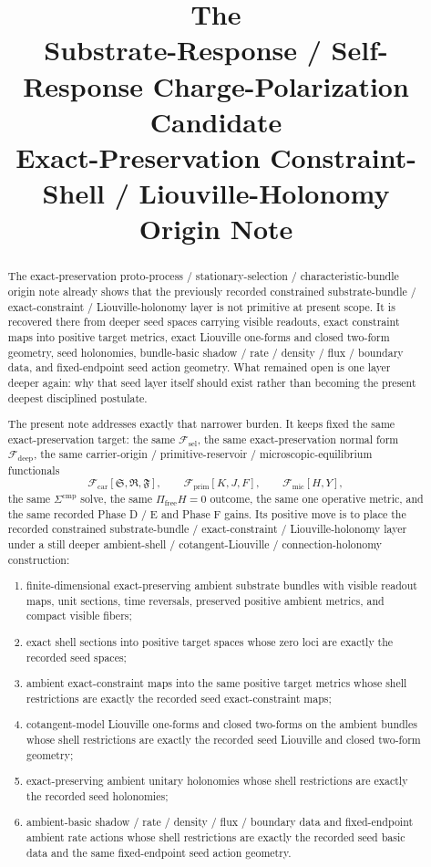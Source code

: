 \documentclass[11pt]{article}
\title{\textbf{The \TheoryName{}}\\[0.4em]
\large Substrate-Response / Self-Response Charge-Polarization Candidate\\
\large Exact-Preservation Constraint-Shell / Liouville-Holonomy\\
\large Origin Note}
\author{}
\date{}
\newcommand{\GaugeAux}{Y}
\newcommand{\MicFunctional}{\mathscr F_{\mathrm{mic}}}
\newcommand{\PrimFunctional}{\mathscr F_{\mathrm{prim}}}
\newcommand{\CarrierFunctional}{\mathscr F_{\mathrm{car}}}
\newcommand{\DeepFunctional}{\mathscr F_{\mathrm{deep}}}
\newcommand{\StemFunctional}{\mathscr F_{\mathrm{sel}}}
\newcommand{\PrimStrain}{K}
\newcommand{\PrimNeutral}{J}
\newcommand{\PrimFree}{F}
\newcommand{\CarrierSeed}{\mathfrak S}
\newcommand{\RelabelSeed}{\mathfrak R}
\newcommand{\FreeSeed}{\mathfrak F}
\begin{document}
\maketitle

\begin{abstract}
The exact-preservation proto-process / stationary-selection / characteristic-bundle origin note already shows that the previously recorded constrained substrate-bundle / exact-constraint / Liouville-holonomy layer is not primitive at present scope. It is recovered there from deeper seed spaces carrying visible readouts, exact constraint maps into positive target metrics, exact Liouville one-forms and closed two-form geometry, seed holonomies, bundle-basic shadow / rate / density / flux / boundary data, and fixed-endpoint seed action geometry. What remained open is one layer deeper again: why that seed layer itself should exist rather than becoming the present deepest disciplined postulate.

The present note addresses exactly that narrower burden. It keeps fixed the same exact-preservation target: the same \(\StemFunctional\), the same exact-preservation normal form \(\DeepFunctional\), the same carrier-origin / primitive-reservoir / microscopic-equilibrium functionals
\[
\CarrierFunctional[\CarrierSeed,\RelabelSeed,\FreeSeed],\qquad
\PrimFunctional[\PrimStrain,\PrimNeutral,\PrimFree],\qquad
\MicFunctional[H,\GaugeAux],
\]
the same \(\Sigma^{\mathrm{cmp}}\) solve, the same \(\Pi_{\mathrm{free}}H=0\) outcome, the same one operative metric, and the same recorded Phase D / E and Phase F gains. Its positive move is to place the recorded constrained substrate-bundle / exact-constraint / Liouville-holonomy layer under a still deeper ambient-shell / cotangent-Liouville / connection-holonomy construction:
\begin{enumerate}
    \item finite-dimensional exact-preserving ambient substrate bundles with visible readout maps, unit sections, time reversals, preserved positive ambient metrics, and compact visible fibers;
    \item exact shell sections into positive target spaces whose zero loci are exactly the recorded seed spaces;
    \item ambient exact-constraint maps into the same positive target metrics whose shell restrictions are exactly the recorded seed exact-constraint maps;
    \item cotangent-model Liouville one-forms and closed two-forms on the ambient bundles whose shell restrictions are exactly the recorded seed Liouville and closed two-form geometry;
    \item exact-preserving ambient unitary holonomies whose shell restrictions are exactly the recorded seed holonomies;
    \item ambient-basic shadow / rate / density / flux / boundary data and fixed-endpoint ambient rate actions whose shell restrictions are exactly the recorded seed basic data and the same fixed-endpoint seed action geometry.
\end{enumerate}


\end{abstract}
\end{document}
